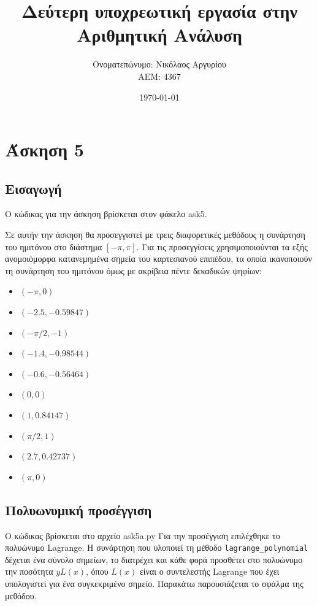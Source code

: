 \documentclass[a4paper,11pt]{article}
\title{Δεύτερη υποχρεωτική εργασία στην Αριθμητική Ανάλυση}
\author{\gt Ονοματεπώνυμο: Νικόλαος Αργυρίου \\  ΑΕΜ: 4367}
\date{\today}
\newcommand{\lt}{\latintext}
\newcommand{\gt}{\greektext}
\begin{document}
\maketitle

\setcounter{section}{4}
\section{Άσκηση 5}
\subsection{Εισαγωγή}

\gt Ο κώδικας για την άσκηση βρίσκεται στον φάκελο \lt ask5.

\gt Σε αυτήν την άσκηση θα προσεγγιστεί με τρεις διαφορετικές μεθόδους η συνάρτηση του ημιτόνου στο διάστημα \lt \([-\pi, \pi]\). \gt Για τις προσεγγίσεις χρησιμοποιούνται τα εξής ανομοιόμορφα κατανεμημένα σημεία του καρτεσιανού επιπέδου, τα οποία ικανοποιούν τη συνάρτηση του ημιτόνου όμως με ακρίβεια πέντε δεκαδικών ψηφίων:

\begin{itemize}
\item $(-\pi, 0)$ \item $(-2.5, -0.59847)$ \item $(-\pi/2, -1)$ \item $(-1.4, -0.98544)$ \item $(-0.6, -0.56464)$ \item $(0, 0)$ \item $(1, 0.84147)$ \item
$(\pi/2, 1)$ \item $(2.7, 0.42737)$ \item $(\pi, 0)$
\end{itemize}

\subsection{\gt Πολυωνυμική προσέγγιση}

Ο κώδικας βρίσκεται στο αρχείο \lt ask5a.py \gt Για την προσέγγιση επιλέχθηκε το πολυώνυμο \lt Lagrange. \gt Η συνάρτηση που υλοποιεί τη μέθοδο \lt \verb|lagrange_polynomial| \gt δέχεται ένα σύνολο σημείων, το διατρέχει και κάθε φορά προσθέτει στο πολυώνυμο την ποσότητα $yL(x)$, όπου $L(x)$ είναι ο συντελεστής \lt Lagrange \gt που έχει υπολογιστεί για ένα συγκεκριμένο σημείο. Παρακάτω παρουσιάζεται το σφάλμα της μεθόδου.
\end{document}
